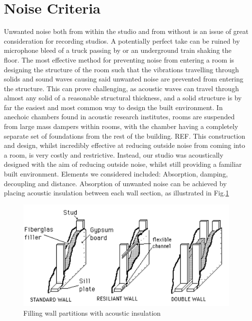 \documentclass[10pt, twocolumn]{article}
\begin{document}
    \section{Noise Criteria}
        Unwanted noise both from within the studio and from without is an issue of great consideration for recording studios.
        A potentially perfect take can be ruined by microphone bleed of a truck passing by or an underground train shaking the floor.
        The most effective method for preventing noise from entering a room is designing the structure of the room such that the vibrations travelling through solids and sound waves causing said unwanted noise are prevented from entering the structure.
        This can prove challenging, as acoustic waves can travel through almost any solid of a reasonable structural thickness, and a solid structure is by far the easiest and most common way to design the built environment.
        In anechoic chambers found in acoustic research institutes, rooms are suspended from large mass dampers within rooms, with the chamber having a completely separate set of foundations from the rest of the building. REF.
        This construction and design, whilst incredibly effective at reducing outside noise from coming into a room, is very costly and restrictive.
        Instead, our studio was acoustically designed with the aim of reducing outside noise, whilst still providing a familiar built environment.
        Elements we considered included: Absorption, damping, decoupling and distance.
        Absorption of unwanted noise can be achieved by placing acoustic insulation between each wall section, as illustrated in Fig.\ref{wallFiller}
        \begin{figure}[H]
            \includegraphics[scale = 0.6]{resources/wallFiller.png}
            \caption{Filling wall partitions with acoustic insulation \cite{UCSC}}
            \label{wallFiller}
            \centering
        \end{figure}
\end{document}

